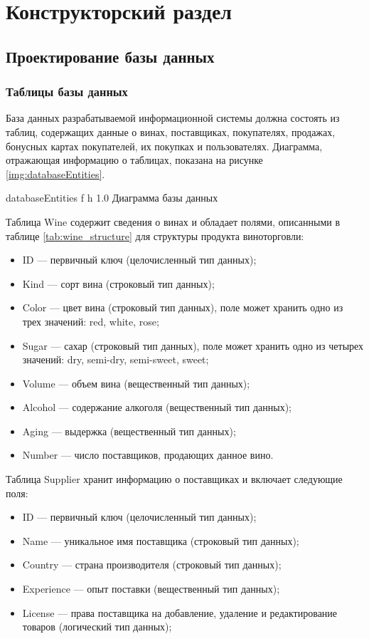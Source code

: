 \chapter{Конструкторский раздел}

\section{Проектирование базы данных}

\subsection{Таблицы базы данных}

База данных разрабатываемой информационной системы должна состоять из таблиц, содержащих данные о винах, поставщиках, покупателях, продажах, бонусных картах покупателей, их покупках и пользователях. Диаграмма, отражающая информацию о таблицах, показана на рисунке \ref{img:databaseEntities}.

    {databaseEntities}
    {f}
    {h}
    {1.0\textwidth}
    {Диаграмма базы данных}
    
Таблица Wine содержит сведения о винах и обладает полями, описанными в таблице \ref{tab:wine_structure} для структуры продукта виноторговли:
\begin{itemize}
	\item ID --- первичный ключ (целочисленный тип данных);
	\item Kind --- сорт вина (строковый тип данных);
	\item Color --- цвет вина (строковый тип данных), поле может хранить одно из трех значений: red, white, rose;
	\item Sugar --- сахар (строковый тип данных), поле может хранить одно из четырех значений: dry, semi-dry, semi-sweet, sweet;
	\item Volume --- объем вина (вещественный тип данных);
	\item Alcohol --- содержание алкоголя (вещественный тип данных);
	\item Aging --- выдержка (вещественный тип данных);
	\item Number --- число поставщиков, продающих данное вино.
\end{itemize}

Таблица Supplier хранит информацию о поставщиках и включает следующие поля:
\begin{itemize}
	\item ID --- первичный ключ (целочисленный тип данных);
	\item Name --- уникальное имя поставщика (строковый тип данных);
	\item Country --- страна производителя (строковый тип данных);
	\item Experience --- опыт поставки (вещественный тип данных);
	\item License --- права поставщика на добавление, удаление и редактирование товаров (логический тип данных);
\end{itemize}


